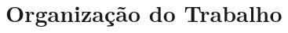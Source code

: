 \section{Organização do Trabalho}

\lipsum[13-14]
    
    
    
     





    






















